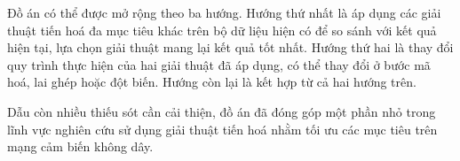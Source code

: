 \documentclass{hust}
\begin{document}
Đồ án có thể được mở rộng theo ba hướng. Hướng thứ nhất là áp dụng các giải thuật tiến hoá đa mục tiêu khác trên bộ dữ liệu hiện có để so sánh với kết quả hiện tại, lựa chọn giải thuật mang lại kết quả tốt nhất. Hướng thứ hai là thay đổi quy trình thực hiện của hai giải thuật đã áp dụng, có thể thay đổi ở bước mã hoá, lai ghép hoặc đột biến. Hướng còn lại là kết hợp từ cả hai hướng trên.


Dẫu còn nhiều thiếu sót cần cải thiện, đồ án đã đóng góp một phần nhỏ trong lĩnh vực nghiên cứu sử dụng giải thuật tiến hoá nhằm tối ưu các mục tiêu trên mạng cảm biến không dây.



\end{document}
